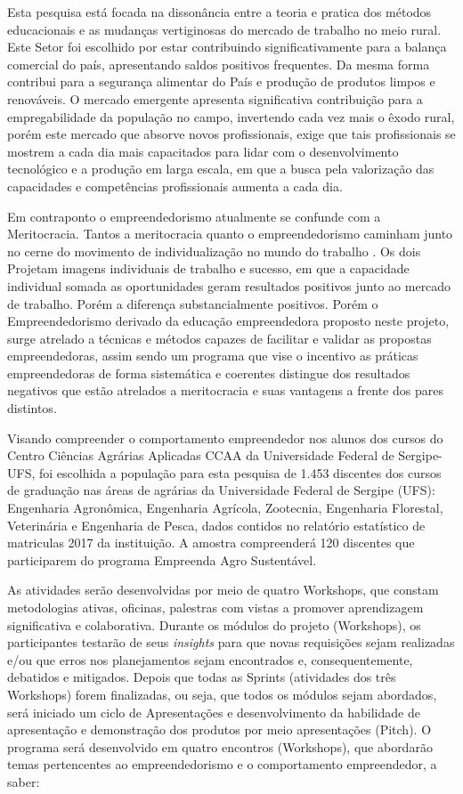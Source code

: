 Esta pesquisa está focada na dissonância entre a teoria e pratica dos métodos educacionais e as mudanças vertiginosas do mercado de trabalho no meio rural. Este Setor foi escolhido por estar contribuindo significativamente para a balança comercial do país, apresentando saldos positivos frequentes. Da mesma forma contribui para a segurança alimentar do País e produção de produtos limpos e renováveis. O mercado emergente apresenta significativa contribuição para a empregabilidade da população no campo, invertendo cada vez mais o êxodo rural, porém este mercado que absorve novos profissionais, exige que tais profissionais se mostrem a cada dia mais capacitados para lidar com o desenvolvimento tecnológico e a produção em larga escala, em que a busca pela valorização das capacidades e competências profissionais aumenta a cada dia. 

Em contraponto o empreendedorismo atualmente se confunde com a Meritocracia. Tantos a meritocracia quanto o empreendedorismo caminham junto no cerne do movimento de individualização no mundo do trabalho \cite{costa_novo_2019}. Os dois  Projetam imagens individuais de trabalho e sucesso, em que a capacidade individual somada as oportunidades geram resultados positivos junto ao mercado de trabalho. Porém a diferença substancialmente positivos. Porém o Empreendedorismo derivado da educação empreendedora proposto neste projeto, surge atrelado a técnicas e métodos capazes de facilitar e validar as propostas empreendedoras, assim sendo um programa que vise o incentivo as práticas empreendedoras de forma sistemática e coerentes distingue dos resultados negativos que estão atrelados a meritocracia e suas vantagens a frente dos pares distintos.

Visando compreender o comportamento empreendedor nos alunos dos cursos do Centro Ciências Agrárias Aplicadas CCAA da Universidade Federal de Sergipe-UFS, foi escolhida a população para esta pesquisa de 1.453 discentes dos cursos de graduação nas áreas de agrárias da Universidade Federal de Sergipe (UFS): Engenharia Agronômica, Engenharia Agrícola, Zootecnia, Engenharia Florestal, Veterinária e Engenharia de Pesca, dados contidos no relatório estatístico de matriculas 2017 da instituição. A amostra compreenderá  120 discentes que participarem do programa Empreenda Agro Sustentável.

As atividades serão desenvolvidas por meio de quatro Workshops, que constam metodologias ativas, oficinas, palestras com vistas a promover aprendizagem significativa e colaborativa. Durante os módulos do projeto (Workshops), os participantes testarão de seus \textit{insights} para que novas requisições sejam realizadas e/ou que erros nos planejamentos sejam encontrados e, consequentemente, debatidos e mitigados. Depois que todas as Sprints (atividades dos três Workshops) forem finalizadas, ou seja, que todos os módulos sejam abordados, será iniciado um ciclo de Apresentações e desenvolvimento da habilidade de apresentação e demonstração dos produtos por meio apresentações (Pitch). O programa será desenvolvido em quatro encontros (Workshops), que abordarão temas pertencentes ao empreendedorismo e o comportamento empreendedor, a saber: 

